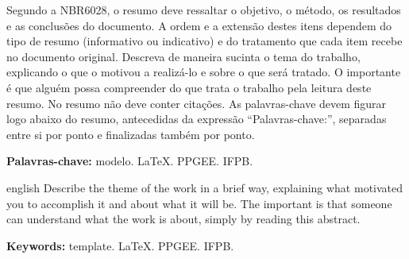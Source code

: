 \begin{resumo}
    Segundo a NBR6028, o resumo deve ressaltar o objetivo, o método, os resultados e as conclusões do documento. A ordem e a extensão destes itens dependem do tipo de resumo (informativo ou indicativo) e do tratamento que cada item recebe no documento original. Descreva de maneira sucinta o tema do trabalho, explicando o que o motivou a realizá-lo e sobre o que será tratado. O importante é que alguém possa compreender do que trata o trabalho pela leitura deste resumo. No resumo não deve conter citações. As palavras-chave devem figurar logo abaixo do resumo, antecedidas da expressão ``Palavras-chave:'', separadas entre si por ponto e finalizadas também por ponto.
    
    \vspace{1em}
    \textbf{Palavras-chave:} modelo. LaTeX. PPGEE. IFPB.
\end{resumo}


\begin{resumo}[Abstract]
 \begin{otherlanguage*}{english}
    Describe the theme of the work in a brief way, explaining what motivated you to accomplish it and about what it will be. The important is that someone can understand what the work is about, simply by reading this abstract.

   \vspace{1em}
   \textbf{Keywords:} template. LaTeX. PPGEE. IFPB.
 \end{otherlanguage*}
\end{resumo}